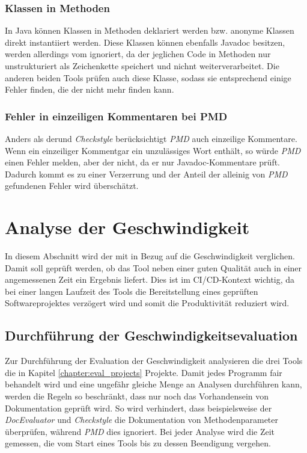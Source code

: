 \subsubsection{Klassen in Methoden}

In Java können Klassen in Methoden deklariert werden bzw. anonyme Klassen direkt instantiiert werden. Diese Klassen können ebenfalls Javadoc besitzen, werden allerdings vom \doceval ignoriert, da der \doceval jeglichen Code in Methoden nur unstrukturiert als Zeichenkette speichert und nichnt weiterverarbeitet. Die anderen beiden Tools prüfen auch diese Klasse, sodass sie entsprechend einige Fehler finden, die der \doceval nicht mehr finden kann. 


\subsubsection{Fehler in einzeiligen Kommentaren bei PMD}
Anders als der\doceval und \textit{Checkstyle} berücksichtigt \textit{PMD} auch einzeilige Kommentare. Wenn ein einzeiliger Kommentgar ein unzulässiges Wort enthält, so würde \textit{PMD} einen Fehler melden, aber der \doceval nicht, da er nur Javadoc-Kommentare prüft. Dadurch kommt es zu einer Verzerrung und der Anteil der alleinig von \textit{PMD} gefundenen Fehler wird überschätzt.  


\clearpage
 \section{Analyse der Geschwindigkeit}
 In diesem Abschnitt wird der \doceval mit \checkpmd in Bezug auf die Geschwindigkeit verglichen. Damit soll geprüft werden, ob das Tool neben einer guten Qualität auch in einer angemessenen Zeit ein Ergebnis liefert. Dies ist im \ac{CI/CD}-Kontext wichtig, da bei einer langen Laufzeit des Tools  die Bereitstellung eines geprüften Softwareprojektes verzögert wird und somit die Produktivität reduziert wird. 
 
 \subsection{Durchführung der Geschwindigkeitsevaluation}
 Zur Durchführung der Evaluation der Geschwindigkeit analysieren die drei Tools die in Kapitel \ref{chapter:eval_projects} Projekte. Damit jedes Programm fair behandelt wird und eine ungefähr gleiche Menge an Analysen durchführen kann, werden die Regeln so beschränkt, dass nur noch das Vorhandensein von Dokumentation geprüft wird. So wird verhindert, dass beispielsweise der \textit{DocEvaluator} und \textit{Checkstyle} die Dokumentation von Methodenparameter überprüfen, während \textit{PMD} dies ignoriert. Bei jeder Analyse wird die Zeit gemessen, die vom Start eines Tools bis zu dessen Beendigung vergehen. 
 
